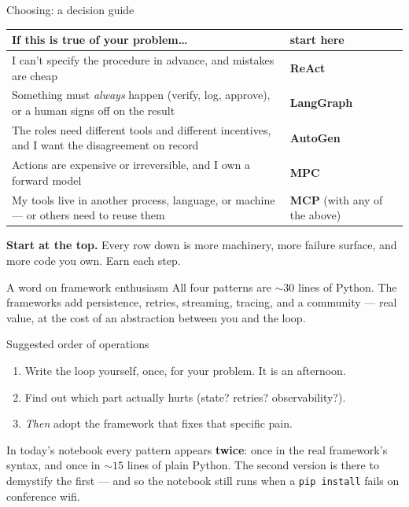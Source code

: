 \documentclass[aspectratio=169,10pt]{beamer}
\newcommand{\code}[1]{\texttt{\small #1}}
\newcommand{\hl}[1]{\textcolor{accent}{\textbf{#1}}}
\begin{document}
\begin{frame}{Choosing: a decision guide}
\begin{center}\small
\begin{tabular}{@{}p{}p{}@{}}
\toprule
\textbf{If this is true of your problem\ldots} & \textbf{start here} \\
\midrule
I can't specify the procedure in advance, and mistakes are cheap
  & \textbf{ReAct} \\[4pt]
Something must \emph{always} happen (verify, log, approve), or a human signs off on the result
  & \textbf{LangGraph} \\[4pt]
The roles need different tools and different incentives, and I want the disagreement on record
  & \textbf{AutoGen} \\[4pt]
Actions are expensive or irreversible, and I own a forward model
  & \textbf{MPC} \\[4pt]
My tools live in another process, language, or machine --- or others need to reuse them
  & \textbf{MCP} (with any of the above) \\
\bottomrule
\end{tabular}
\end{center}

\vspace{1em}
\begin{center}
\hl{Start at the top.} Every row down is more machinery, more failure surface,
and more code you own. Earn each step.
\end{center}
\end{frame}

\begin{frame}{A word on framework enthusiasm}
All four patterns are ${\sim}30$ lines of Python. The frameworks add
persistence, retries, streaming, tracing, and a community --- real value, at
the cost of an abstraction between you and the loop.

\vspace{1em}
\begin{center}
\begin{minipage}{0.85\textwidth}
\begin{block}{Suggested order of operations}
\begin{enumerate}\itemsep2pt
  \item Write the loop yourself, once, for your problem. It is an afternoon.
  \item Find out which part actually hurts (state? retries? observability?).
  \item \emph{Then} adopt the framework that fixes that specific pain.
\end{enumerate}
\end{block}
\end{minipage}
\end{center}

\vspace{1em}
In today's notebook every pattern appears \hl{twice}: once in the real
framework's syntax, and once in ${\sim}15$ lines of plain Python. The second
version is there to demystify the first --- and so the notebook still runs when
a \code{pip install} fails on conference wifi.
\end{frame}
\end{document}
